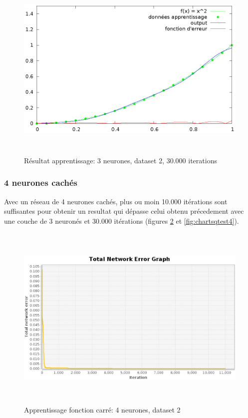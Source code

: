 \documentclass[twoside,openright,a4paper,11pt,french]{article}
\begin{document}
\begin{figure}[h]
\centering
\includegraphics[width=12cm,height=9cm]{./pics/chartsqtest3.eps}
\caption{Résultat apprentissage: 3 neurones, dataset 2, 30.000 iterations}
\label{fig:chartsqtest3}
\end{figure}


\subsubsection{4 neurones cachés}

Avec un réseau de 4 neurones cachés, plus ou moin 10.000 itérations
sont suffisantes pour obtenir un resultat qui dépasse celui obtenu
précedement avec une couche de 3 neuronés et 30.000 itérations 
(figures \ref{fig:sqtest4} et \ref{fig:chartsqtest4}).


\begin{figure}[h]
\centering
\includegraphics[width=12cm,height=9cm]{./pics/sqtest4.eps}
\caption{Apprentissage fonction carré: 4 neurones, dataset 2}
\label{fig:sqtest4}
\end{figure}
\end{document}
